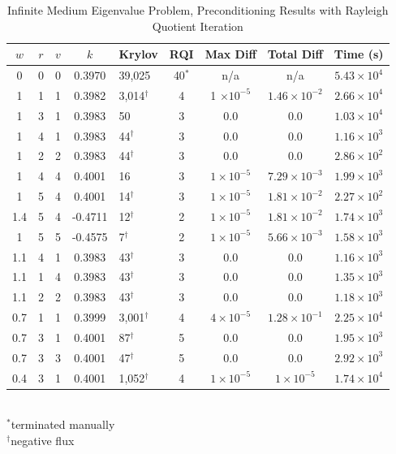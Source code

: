 \begin{table}[!h]
\caption{Infinite Medium Eigenvalue Problem, Preconditioning Results with Rayleigh Quotient Iteration}
\begin{center}
\begin{tabular}{c c c c l c c c c}
\hline
$w$ & $r$ & $v$ & $k$ & Krylov & RQI & Max Diff & Total Diff & Time (s) \\[0.5ex]
\hline
0    & 0 & 0 & 0.3970 & 39,025              & 40$^{*}$  & n/a & n/a & $5.43 \times 10^{4}$ \\
1    & 1 & 1 & 0.3982 & 3,014$^{\dag}$ & 4 & 1 $\times 10^{-5}$ & $1.46 \times 10^{-2}$ & $2.66 \times 10^{4}$ \\
1    & 3 & 1 & 0.3983 & 50                     & 3 & 0.0 & 0.0 & $1.03 \times 10^{4}$ \\
1    & 4 & 1 & 0.3983 & 44$^{\dag}$      & 3 & 0.0 & 0.0 & $1.16 \times 10^{3}$ \\
1    & 2 & 2 & 0.3983 & 44$^{\dag}$      & 3 & 0.0 & 0.0 & $2.86 \times 10^{2}$ \\
1    & 4 & 4 & 0.4001 & 16                     & 3 & $1 \times 10^{-5}$ & $7.29 \times 10^{-3}$ & $1.99 \times 10^{3}$ \\
1    & 5 & 4 & 0.4001 & 14$^{\dag}$     & 3 & $1 \times 10^{-5}$ & $1.81 \times 10^{-2}$ & $2.27 \times 10^{2}$ \\
1.4 & 5 & 4 & -0.4711 & 12$^{\dag}$    & 2 & $1 \times 10^{-5}$ & $1.81 \times 10^{-2}$ & $1.74 \times 10^{3}$ \\
1    & 5 & 5 & -0.4575 & 7$^{\dag}$      & 2 & $1 \times 10^{-5}$ & $5.66 \times 10^{-3}$ & $1.58 \times 10^{3}$ \\
\hline
1.1 & 4 & 1 & 0.3983 & 43$^{\dag}$      & 3 & 0.0 & 0.0 & $1.16 \times 10^{3}$ \\
1.1 & 1 & 4 & 0.3983 & 43$^{\dag}$      & 3 & 0.0 & 0.0 & $1.35 \times 10^{3}$ \\
1.1 & 2 & 2 & 0.3983 & 43$^{\dag}$      & 3 & 0.0 & 0.0 & $1.18 \times 10^{3}$ \\
\hline
0.7 & 1 & 1 & 0.3999 & 3,001$^{\dag}$ & 4 & $4 \times 10^{-5}$ & $1.28 \times 10^{-1}$ & $2.25 \times 10^{4}$ \\
0.7 & 3 & 1 & 0.4001 & 87$^{\dag}$      & 5 & 0.0 & 0.0 & $1.95 \times 10^{3}$ \\
0.7 & 3 & 3 & 0.4001 & 47$^{\dag}$      & 5 & 0.0 & 0.0 & $2.92 \times 10^{3}$ \\
0.4 & 3 & 1 & 0.4001 & 1,052$^{\dag}$ & 4 & $1 \times 10^{-5}$ & $1 \times 10^{-5}$      & $1.74 \times 10^{4}$ \\
\hline 
\end{tabular}\\
$^{*}$terminated manually\\
$^{\dag}$negative flux
\end{center}
\label{table:impi RQI}
\end{table}
